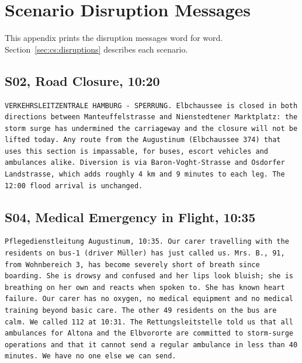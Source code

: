 \chapter{Scenario Disruption Messages}
\label{app:scenarios}

This appendix prints the disruption messages word for word.
Section~\ref{sec:cs:disruptions} describes each scenario.

\section{S02, Road Closure, 10:20}

\begin{lstlisting}[style=prompt]
VERKEHRSLEITZENTRALE HAMBURG - SPERRUNG. Elbchaussee is closed in both directions between Manteuffelstrasse and Nienstedtener Marktplatz: the storm surge has undermined the carriageway and the closure will not be lifted today. Any route from the Augustinum (Elbchaussee 374) that uses this section is impassable, for buses, escort vehicles and ambulances alike. Diversion is via Baron-Voght-Strasse and Osdorfer Landstrasse, which adds roughly 4 km and 9 minutes to each leg. The 12:00 flood arrival is unchanged.
\end{lstlisting}

\section{S04, Medical Emergency in Flight, 10:35}

\begin{lstlisting}[style=prompt]
Pflegedienstleitung Augustinum, 10:35. Our carer travelling with the residents on bus-1 (driver Müller) has just called us. Mrs. B., 91, from Wohnbereich 3, has become severely short of breath since boarding. She is drowsy and confused and her lips look bluish; she is breathing on her own and reacts when spoken to. She has known heart failure. Our carer has no oxygen, no medical equipment and no medical training beyond basic care. The other 49 residents on the bus are calm. We called 112 at 10:31. The Rettungsleitstelle told us that all ambulances for Altona and the Elbvororte are committed to storm-surge operations and that it cannot send a regular ambulance in less than 40 minutes. We have no one else we can send.
\end{lstlisting}

